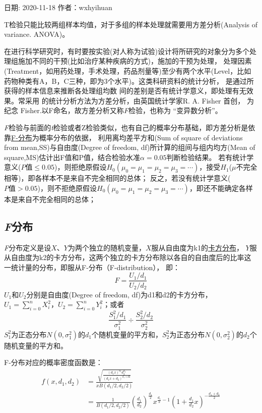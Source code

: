 \documentclass[
]{article}
\begin{document}
日期: 2020-11-18
作者：wxhyihuan

T检验只能比较两组样本均值，对于多组的样本处理就需要用方差分析(Analysis of variance. ANOVA)。

在进行科学研究时，有时要按实验(对人称为试验)设计将所研究的对象分为多个处理组施加不同的干预(比如治疗某种疾病的方式)，施加的干预为处理，
处理因素(Treatment，如用药处理，手术处理，药品剂量等)至少有两个水平(Level，比如药物种类有A，B，C三种，即为3个水平)。这类科研资料的统计分析， 是通过所获得的样本信息来推断各处理组均数
间的差别是否有统计学意义，即处理有无效果。常采用 的统计分析方法为方差分析，由英国统计学家R. A. Fisher 首创，
为纪念 Fisher.以F命名，故方差分析又称\emph{F}检验，也称为 ``变异数分析''。

\emph{F}检验与前面的\emph{t}检验或者Z检验类似，也有自己的概率分布基础，即方差分析是依靠\href{https://zh.wikipedia.org/wiki/F-\%E5\%88\%86\%E5\%B8\%83}{F-分布}为概率分布的依据，
利用离均差平方和(Sum of square of deviations from mean,SS)与自由度(Degree of freedom, df)所计算的组间与组内均方(Mean of square,MS)估计出F值和P值，结合检验水准\(\alpha=0.05\)判断检验结果。
若有统计学意义(\(P值\le0.05\))，则拒绝原假设\(H_0(μ_0=μ_1=μ_2=μ_3=\cdots)\)，接受\(H_1\)(\(μ\)不完全相等)，即各样本不是来自不完全相同的总体；
反之，若没有统计学意义(\(P值>0.05\))，则不拒绝原假设\(H_0(μ_0=μ_1=μ_2=μ_3=\cdots)\)，即还不能确定各样本是来自不完全相同的总体；

\hypertarget{fux5206ux5e03}{%
\subsection{\texorpdfstring{\emph{F}分布}{F分布}}\label{fux5206ux5e03}}

\emph{F}分布定义是设\(X\)、\(Y\)为两个独立的随机变量，\(X\)服从自由度为k1的\href{https://zh.wikipedia.org/zh-cn/\%E5\%8D\%A1\%E6\%96\%B9\%E5\%88\%86\%E4\%BD\%88}{卡方分布}，
\(Y\)服从自由度为k2的卡方分布，这两个独立的卡方分布除以各自的自由度后的比率这一统计量的分布，即服从F-分布（F-distribution），
即：
\[F=\frac{U_1/d_1}{U_2/d_2}\]
\(U_1\)和\(U_2\)分别是自由度(Degree of freedom, df)为d1和d2的卡方分布，\(U_1=\sum_{i=0}^nX_i^2\)，\(U_2=\sum_{i=0}^nY_i^2\)；或者
\[\frac{S_1^2/d_1}{\sigma_1^2}\div\frac{S_2^2/d_2}{\sigma_2^2}\]
\(S_1^2\)为正态分布\(N(0,\sigma_1^2)\)的\(d_1\)个随机变量的平方和，\(S_2^2\)为正态分布\(N(0,\sigma_2^2)\)的\(d_2\)个随机变量的平方和。

F-分布对应的概率密度函数是：
\[\begin{aligned}
f(x,d_1,d_2) &= \frac{\sqrt{\frac{(d_{1}x)^{d_1} d_2^{d_2}}{(d_{1}x+d_2)^{d_1+d2}}}}{xB\left(d_{1}/2,d_{2}/2\right)}\\
&= \frac{1}{B\left(d_{1}/2,d_{2}/2\right)}\left(\frac{d_1}{d_2}\right)^{\frac{d_1}{2}}x^{\frac{d_1}{2}-1}\left(1+\frac{d_1}{d_2}x\right)^{-\frac{d_1+d_2}{2}}
\end{aligned}\]
\end{document}
